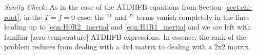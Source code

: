 \noindent\textit{Sanity Check:} As in the case of the ATDHFB equations from Section~\ref{sect:chi-rdot}, in the $T=f=0$ case, the $^{11}$ and $^{22}$ terms vanish completely in the lines leading up to \eqref{eqn:H0R2_inertia} and \eqref{eqn:H1R1_inertia} and we are left with familiar [zero-temperature] ATDHFB expressions. In essence, the rank of the problem reduces from dealing with a 4x4 matrix to dealing with a 2x2 matrix.



